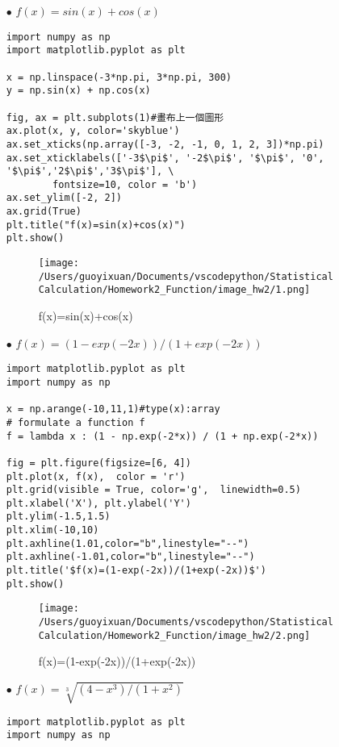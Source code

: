\begin{itemize}
\item[$\bullet$] $f(x)=sin(x)+cos(x)$
\bigskip
	\begin{lstlisting}
import numpy as np
import matplotlib.pyplot as plt

x = np.linspace(-3*np.pi, 3*np.pi, 300)
y = np.sin(x) + np.cos(x)

fig, ax = plt.subplots(1)#畫布上一個圖形
ax.plot(x, y, color='skyblue')
ax.set_xticks(np.array([-3, -2, -1, 0, 1, 2, 3])*np.pi)
ax.set_xticklabels(['-3$\pi$', '-2$\pi$', '$\pi$', '0', '$\pi$','2$\pi$','3$\pi$'], \
        fontsize=10, color = 'b')
ax.set_ylim([-2, 2])
ax.grid(True)
plt.title("f(x)=sin(x)+cos(x)")
plt.show()
	\end{lstlisting}
\bigskip

\begin{figure}[H]
    \centering
        \texttt{[image: /Users/guoyixuan/Documents/vscodepython/Statistical Calculation/Homework2\_Function/image\_hw2/1.png]}
    \caption{f(x)=sin(x)+cos(x)}
    \label{fig:sincos}
\end{figure}


\item[$\bullet$] $f(x)=(1-exp(-2x))/(1+exp(-2x))$

\bigskip
\begin{lstlisting}
import matplotlib.pyplot as plt
import numpy as np
 
x = np.arange(-10,11,1)#type(x):array
# formulate a function f
f = lambda x : (1 - np.exp(-2*x)) / (1 + np.exp(-2*x))
 
fig = plt.figure(figsize=[6, 4])
plt.plot(x, f(x),  color = 'r')
plt.grid(visible = True, color='g',  linewidth=0.5)
plt.xlabel('X'), plt.ylabel('Y')
plt.ylim(-1.5,1.5)
plt.xlim(-10,10)
plt.axhline(1.01,color="b",linestyle="--")
plt.axhline(-1.01,color="b",linestyle="--")
plt.title('$f(x)=(1-exp(-2x))/(1+exp(-2x))$')
plt.show()
\end{lstlisting}

\begin{figure}[H]
    \centering
        \texttt{[image: /Users/guoyixuan/Documents/vscodepython/Statistical Calculation/Homework2\_Function/image\_hw2/2.png]}
    \caption{f(x)=(1-exp(-2x))/(1+exp(-2x))}
    \label{fig:exp}
\end{figure}

\item[$\bullet$] $f(x)=\sqrt[3]{(4-x^3)/(1+x^2)}$
\bigskip
\begin{lstlisting}
import matplotlib.pyplot as plt
import numpy as np
 

\end{lstlisting}
\end{itemize}
